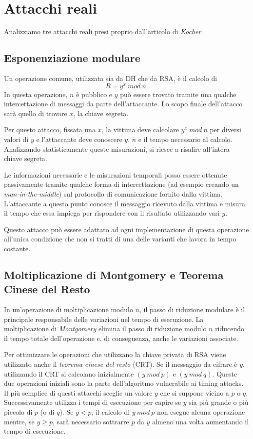 	\section{Attacchi reali}
	
	Analizziamo tre attacchi reali presi proprio dall'articolo di \emph{Kocher}.
	
		\subsection{Esponenziazione modulare}
		Un operazione comune, utilizzata sia da \ac{DH} che da RSA, è il calcolo di $$R = y^{x} \ mod \ n.$$ In questa operazione, $n$ è pubblico e $y$ può essere trovato tramite una qualche intercettazione di messaggi da parte dell'attaccante. Lo scopo finale dell'attacco sarà quello di trovare $x$, la chiave segreta.
		
		Per questo attacco, fissata una $x$, la vittima deve calcolare $y^{x} \ mod \ n$ per diversi valori di $y$ e l'attaccante deve conoscere $y$, $n$ e il tempo necessario al calcolo.
		Analizzando statisticamente queste misurazioni, si riesce a risalire all'intera chiave segreta.
		
		Le informazioni necessarie e le misurazioni temporali posso essere ottenute passivamente tramite qualche forma di intercettazione (ad esempio creando un \emph{man-in-the-middle}) sul protocollo di comunicazione fornito dalla vittima. L'attaccante a questo punto conosce il messaggio ricevuto dalla vittima e misura il tempo che essa impiega per rispondere con il risultato utilizzando vari $y$.
		
		Questo attacco può essere adattato ad ogni implementazione di questa operazione all'unica condizione che non si tratti di una delle varianti che lavora in tempo costante.
		
		\subsection{Moltiplicazione di Montgomery e Teorema Cinese del Resto}
		In un'operazione di moltiplicazione modulo $n$, il passo di riduzione modulare è il principale responsabile delle variazioni nel tempo di esecuzione. La moltiplicazione di \emph{Montgomery}\cite{montgomery1985modular} elimina il passo di riduzione modulo $n$ riducendo il tempo totale dell'operazione e, di conseguenza, anche le variazioni associate.
		
		Per ottimizzare le operazioni che utilizzano la chiave privata di RSA viene utilizzato anche il \emph{teorema cinese del resto} (\ac{CRT}). Se il messaggio da cifrare è $y$, utilizzando il \ac{CRT} si calcolano inizialmente $(y \ mod \ p)$ e $(y \ mod \ q)$. Queste due operazioni iniziali sono la parte dell'algoritmo vulnerabile ai timing attacks. Il più semplice di questi attacchi sceglie un valore $y$ che si suppone vicino a $p$ o $q$. Successivamente utilizza i tempi di esecuzione per capire se $y$ sia più grande o più piccolo di $p$ (o di $q$). Se $y < p$, il calcolo di $y \ mod \ p$ non esegue alcuna operazione mentre, se $y \geq p$, sarà necessario sottrarre $p$ da $y$ almeno una volta aumentando il tempo di esecuzione.
		
